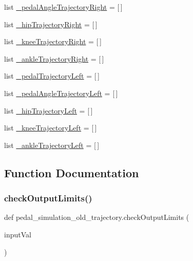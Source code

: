 \begin{DoxyCompactItemize}
\item 
list \mbox{\hyperlink{namespacepedal__simulation__old__trajectory_a40a5d4cf6b105a6b36482cf05341d0a9}{\+\_\+pedal\+Angle\+Trajectory\+Right}} = \mbox{[}$\,$\mbox{]}
\item 
list \mbox{\hyperlink{namespacepedal__simulation__old__trajectory_a1c7f69007c32d2dc817941726f7bb721}{\+\_\+hip\+Trajectory\+Right}} = \mbox{[}$\,$\mbox{]}
\item 
list \mbox{\hyperlink{namespacepedal__simulation__old__trajectory_a8e54c2f4f4b7a3180e0e3cd52f242033}{\+\_\+knee\+Trajectory\+Right}} = \mbox{[}$\,$\mbox{]}
\item 
list \mbox{\hyperlink{namespacepedal__simulation__old__trajectory_a000442c81cfabcd5bf11de8227658680}{\+\_\+ankle\+Trajectory\+Right}} = \mbox{[}$\,$\mbox{]}
\item 
list \mbox{\hyperlink{namespacepedal__simulation__old__trajectory_ac212bceec47d4be827fe0ec3c87f74ff}{\+\_\+pedal\+Trajectory\+Left}} = \mbox{[}$\,$\mbox{]}
\item 
list \mbox{\hyperlink{namespacepedal__simulation__old__trajectory_ab7d9954ed6c671280bf1b88983d9b030}{\+\_\+pedal\+Angle\+Trajectory\+Left}} = \mbox{[}$\,$\mbox{]}
\item 
list \mbox{\hyperlink{namespacepedal__simulation__old__trajectory_a377198dbe1c65450ce4c0076a406f4f6}{\+\_\+hip\+Trajectory\+Left}} = \mbox{[}$\,$\mbox{]}
\item 
list \mbox{\hyperlink{namespacepedal__simulation__old__trajectory_aa2ea9a35bf6dbfbcc506660647c0219a}{\+\_\+knee\+Trajectory\+Left}} = \mbox{[}$\,$\mbox{]}
\item 
list \mbox{\hyperlink{namespacepedal__simulation__old__trajectory_a7235225ab90dd172a9577eb9c06da65a}{\+\_\+ankle\+Trajectory\+Left}} = \mbox{[}$\,$\mbox{]}
\end{DoxyCompactItemize}


\subsection{Function Documentation}
\mbox{\label{namespacepedal__simulation__old__trajectory_a4ea25e80b3e7655af96e83c601105731}} 
\subsubsection{\texorpdfstring{checkOutputLimits()}{checkOutputLimits()}}
{\footnotesize\ttfamily def pedal\+\_\+simulation\+\_\+old\+\_\+trajectory.\+check\+Output\+Limits (\begin{DoxyParamCaption}\item[{}]{input\+Val }\end{DoxyParamCaption})}



